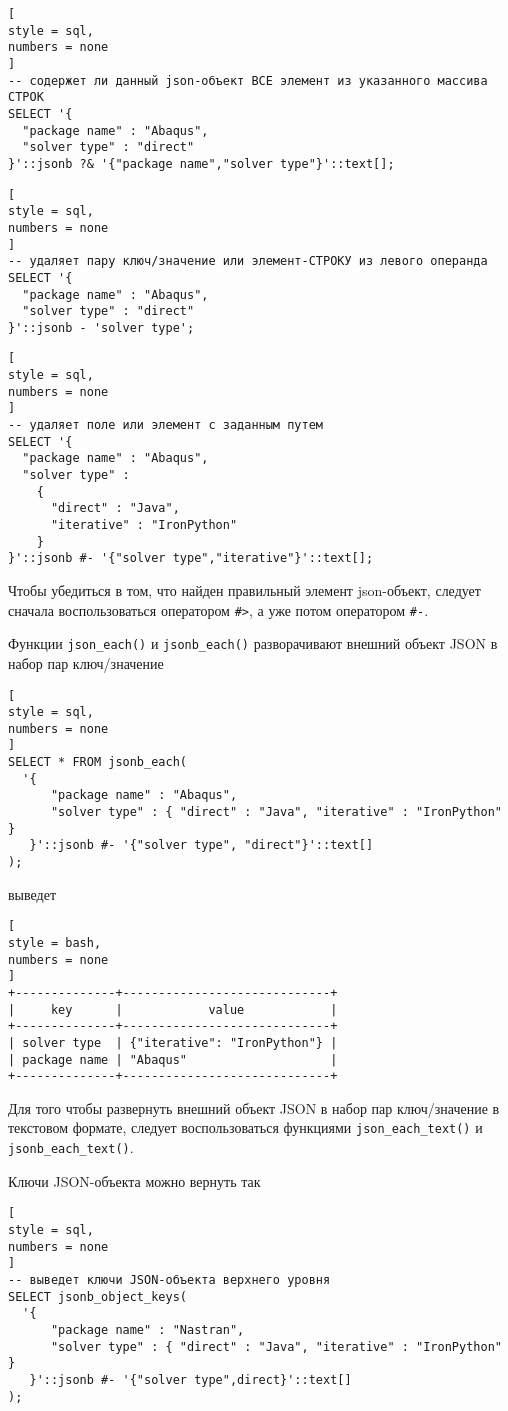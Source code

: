 \documentclass[%
	11pt,
	a4paper,
	utf8,
		]{article}
\begin{document}
\begin{lstlisting}[
style = sql, 
numbers = none
]
-- содержет ли данный json-объект ВСЕ элемент из указанного массива СТРОК
SELECT '{
  "package name" : "Abaqus",
  "solver type" : "direct"
}'::jsonb ?& '{"package name","solver type"}'::text[];
\end{lstlisting}

\begin{lstlisting}[
style = sql, 
numbers = none
]
-- удаляет пару ключ/значение или элемент-СТРОКУ из левого операнда 
SELECT '{
  "package name" : "Abaqus",
  "solver type" : "direct"
}'::jsonb - 'solver type';
\end{lstlisting}

\begin{lstlisting}[
style = sql, 
numbers = none
]
-- удаляет поле или элемент с заданным путем
SELECT '{
  "package name" : "Abaqus",
  "solver type" :
    {
      "direct" : "Java",
      "iterative" : "IronPython"
    }
}'::jsonb #- '{"solver type","iterative"}'::text[];
\end{lstlisting}

Чтобы убедиться в том, что найден правильный элемент json-объект, следует сначала воспользоваться оператором \verb|#>|, а уже потом оператором \verb|#-|.

Функции \texttt{json\_each()} и \texttt{jsonb\_each()} разворачивают внешний объект JSON в набор пар ключ/значение
\begin{lstlisting}[
style = sql, 
numbers = none
]
SELECT * FROM jsonb_each(
  '{
      "package name" : "Abaqus",
      "solver type" : { "direct" : "Java", "iterative" : "IronPython" }
   }'::jsonb #- '{"solver type", "direct"}'::text[]
);
\end{lstlisting}
выведет
\begin{lstlisting}[
style = bash,
numbers = none
]
+--------------+-----------------------------+
|     key      |            value            |
+--------------+-----------------------------+
| solver type  | {"iterative": "IronPython"} |
| package name | "Abaqus"                    |
+--------------+-----------------------------+
\end{lstlisting}

Для того чтобы развернуть внешний объект JSON в набор пар ключ/значение в текстовом формате, следует воспользоваться функциями \texttt{json\_each\_text()} и \texttt{jsonb\_each\_text()}.

Ключи JSON-объекта можно вернуть так
\begin{lstlisting}[
style = sql, 
numbers = none
]
-- выведет ключи JSON-объекта верхнего уровня
SELECT jsonb_object_keys(
  '{
      "package name" : "Nastran",
      "solver type" : { "direct" : "Java", "iterative" : "IronPython" }   
   }'::jsonb #- '{"solver type",direct}'::text[]
);
\end{lstlisting}
\end{document}

